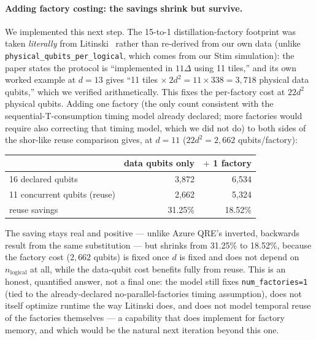 \documentclass[9pt,twocolumn]{extarticle}
\begin{document}
\paragraph{Adding factory costing: the savings shrink but survive.} We
implemented this next step. The 15-to-1 distillation-factory footprint was
taken \emph{literally} from Litinski~\cite{litinski2019game} rather than
re-derived from our own data (unlike \texttt{physical\_qubits\_per\_logical},
which comes from our Stim simulation): the paper states the protocol is
``implemented in $11\Delta$ using 11 tiles,'' and its own worked example at
$d=13$ gives ``11 tiles $\times\ 2d^2 = 11\times338 = 3{,}718$ physical data
qubits,'' which we verified arithmetically. This fixes the per-factory cost
at $22d^2$ physical qubits. Adding one factory (the only count consistent
with the sequential-T-consumption timing model already declared; more
factories would require also correcting that timing model, which we did not
do) to both sides of the shor-like reuse comparison gives, at $d=11$
($22d^2=2{,}662$ qubits/factory):
\begin{center}
\begin{tabular}{lrr}
\toprule
 & data qubits only & $+$ 1 factory \\
\midrule
16 declared qubits & 3{,}872 & 6{,}534 \\
11 concurrent qubits (reuse) & 2{,}662 & 5{,}324 \\
reuse savings & 31.25\% & 18.52\% \\
\bottomrule
\end{tabular}
\end{center}
The saving stays real and positive --- unlike Azure QRE's inverted,
backwards result from the same substitution --- but shrinks from 31.25\% to
18.52\%, because the factory cost ($2{,}662$ qubits) is fixed once $d$ is
fixed and does not depend on $n_{\text{logical}}$ at all, while the data-qubit
cost benefits fully from reuse. This is an honest, quantified answer, not a
final one: the model still fixes \texttt{num\_factories=1} (tied to the
already-declared no-parallel-factories timing assumption), does not itself
optimize runtime the way Litinski does, and does not model temporal reuse of
the factories themselves --- a capability that
\cite{latticesurgerycompiler2025} does implement for factory memory, and
which would be the natural next iteration beyond this one.
\end{document}
